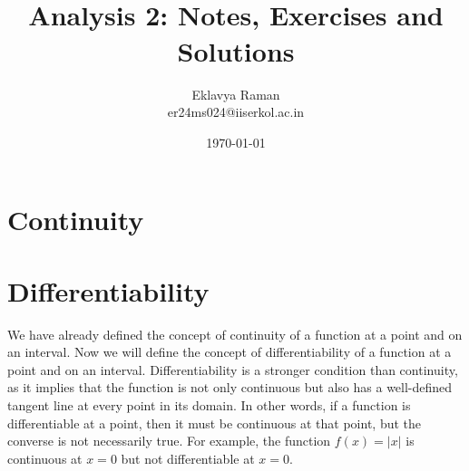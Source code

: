 \documentclass[openany]{book}
\begin{document}
\title{\Large{} \\ \vspace{5pt}
\large{Analysis 2: Notes, Exercises and Solutions}}
\author{Eklavya Raman \\ \vspace{5pt} er24ms024@iiserkol.ac.in \\ \vspace{5pt}}
\date{\today}
\maketitle
\tableofcontents
\listoftheorems[
    show=mytheorem,
    title={List of Theorems}]

\chapter{Continuity}
\chapter{Differentiability}
We have already defined the concept of continuity of a function at a point and on an interval. Now we will define the concept of differentiability of a function at a point and on an interval. Differentiability is a stronger condition than continuity, as it implies that the function is not only continuous but also has a well-defined tangent line at every point in its domain. In other words, if a function is differentiable at a point, then it must be continuous at that point, but the converse is not necessarily true. For example, the function $f(x) = |x|$ is continuous at $x = 0$ but not differentiable at $x = 0$.
\end{document}
